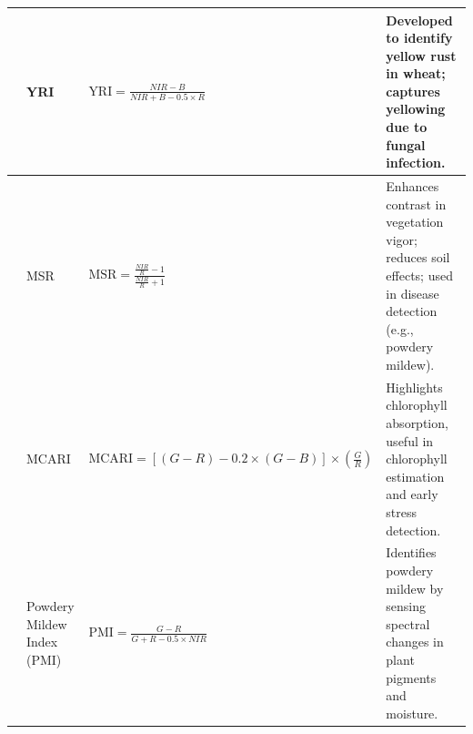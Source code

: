 \begin{table}[htbp]
{\begin{tabular}{|p{2.5cm}|p{4cm}|p{7.5cm}|p{7cm}|}
    \hline
    \parencite{guo2021wheat} & YRI & \(\text{YRI} = \frac{NIR - B}{NIR + B - 0.5 \times R}\) & Developed to identify yellow rust in wheat; captures yellowing due to fungal infection. \\
    \hline
    \parencite{guo2021wheat} & MSR & \(\text{MSR} = \frac{\frac{NIR}{R} - 1}{\frac{NIR}{R} + 1}\) & Enhances contrast in vegetation vigor; reduces soil effects; used in disease detection (e.g., powdery mildew). \\
    \hline
    \parencite{guo2021wheat} & MCARI & \(\text{MCARI} = [(G - R) - 0.2 \times (G - B)] \times \left(\frac{G}{R}\right)\) & Highlights chlorophyll absorption, useful in chlorophyll estimation and early stress detection. \\
    \hline
    \parencite{guo2021wheat} & Powdery Mildew Index (PMI) & \(\text{PMI} = \frac{G - R}{G + R - 0.5 \times NIR}\) & Identifies powdery mildew by sensing spectral changes in plant pigments and moisture. \\
    \hline
    \end{tabular}%
    }
    \label{tab:vegetation-indices2}
\end{table}
